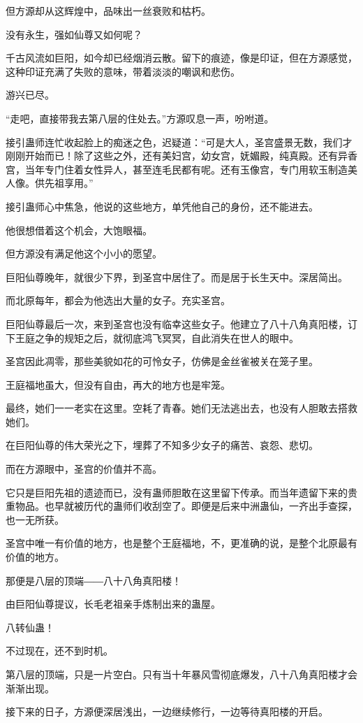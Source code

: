 \begin{this_body}
但方源却从这辉煌中，品味出一丝衰败和枯朽。

没有永生，强如仙尊又如何呢？

千古风流如巨阳，如今却已经烟消云散。留下的痕迹，像是印证，但在方源感觉，这种印证充满了失败的意味，带着淡淡的嘲讽和悲伤。

游兴已尽。

“走吧，直接带我去第八层的住处去。”方源叹息一声，吩咐道。

接引蛊师连忙收起脸上的痴迷之色，迟疑道：“可是大人，圣宫盛景无数，我们才刚刚开始而已！除了这些之外，还有美妇宫，幼女宫，妩媚殿，纯真殿。还有异香宫，当年专门住着女性异人，甚至连毛民都有呢。还有玉像宫，专门用软玉制造美人像。供先祖享用。”

接引蛊师心中焦急，他说的这些地方，单凭他自己的身份，还不能进去。

他很想借着这个机会，大饱眼福。

但方源没有满足他这个小小的愿望。

巨阳仙尊晚年，就很少下界，到圣宫中居住了。而是居于长生天中。深居简出。

而北原每年，都会为他选出大量的女子。充实圣宫。

巨阳仙尊最后一次，来到圣宫也没有临幸这些女子。他建立了八十八角真阳楼，订下王庭之争的规矩之后，就彻底鸿飞冥冥，自此消失在世人的眼中。

圣宫因此凋零，那些美貌如花的可怜女子，仿佛是金丝雀被关在笼子里。

王庭福地虽大，但没有自由，再大的地方也是牢笼。

最终，她们一一老实在这里。空耗了青春。她们无法逃出去，也没有人胆敢去搭救她们。

在巨阳仙尊的伟大荣光之下，埋葬了不知多少女子的痛苦、哀怨、悲切。

而在方源眼中，圣宫的价值并不高。

它只是巨阳先祖的遗迹而已，没有蛊师胆敢在这里留下传承。而当年遗留下来的贵重物品。也早就被历代的蛊师们收刮空了。即便是后来中洲蛊仙，一齐出手查探，也一无所获。

圣宫中唯一有价值的地方，也是整个王庭福地，不，更准确的说，是整个北原最有价值的地方。

那便是八层的顶端――八十八角真阳楼！

由巨阳仙尊提议，长毛老祖亲手炼制出来的蛊屋。

八转仙蛊！

不过现在，还不到时机。

第八层的顶端，只是一片空白。只有当十年暴风雪彻底爆发，八十八角真阳楼才会渐渐出现。

接下来的日子，方源便深居浅出，一边继续修行，一边等待真阳楼的开启。


\end{this_body}
